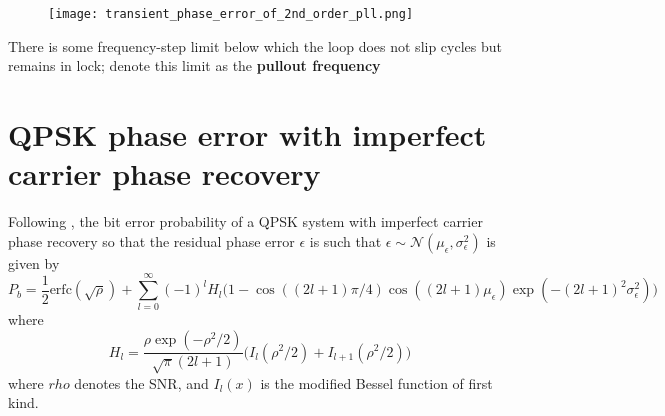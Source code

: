 \documentclass[a4paper]{article}
\begin{document}
\begin{figure}[h!]
	\centering
	\texttt{[image: transient\_phase\_error\_of\_2nd\_order\_pll.png]}
	\label{fig:transient_2nd_pll}
	\caption{\cite{Gardner}}
\end{figure}

There is some frequency-step limit below which the loop does not slip cycles but remains in lock; denote this limit as the \textbf{pullout frequency}


\section{QPSK phase error with imperfect carrier phase recovery}
Following \cite{Prabhu1976}, the bit error probability of a QPSK system with imperfect carrier phase recovery so that the residual phase error $\epsilon$ is such that $\epsilon \sim \mathcal{N}(\mu_\epsilon, \sigma_\epsilon^2)$ is given by
\begin{equation}
P_b = \frac{1}{2}\mathrm{erfc}(\sqrt{\rho}) + \sum_{l = 0}^\infty (-1)^lH_l\Big(1 - \cos((2l+1)\pi/4)\cos((2l+1)\mu_\epsilon)\exp(-(2l+1)^2\sigma_\epsilon^2)\Big)
\end{equation}
where
\begin{equation}
H_l = \frac{\rho\exp(-\rho^2/2)}{\sqrt{\pi}(2l+1)}\Big(I_l(\rho^2/2) + I_{l+1}(\rho^2/2)\Big)
\end{equation}
where $rho$ denotes the SNR, and $I_l(x)$ is the modified Bessel function of first kind.





\end{document}
